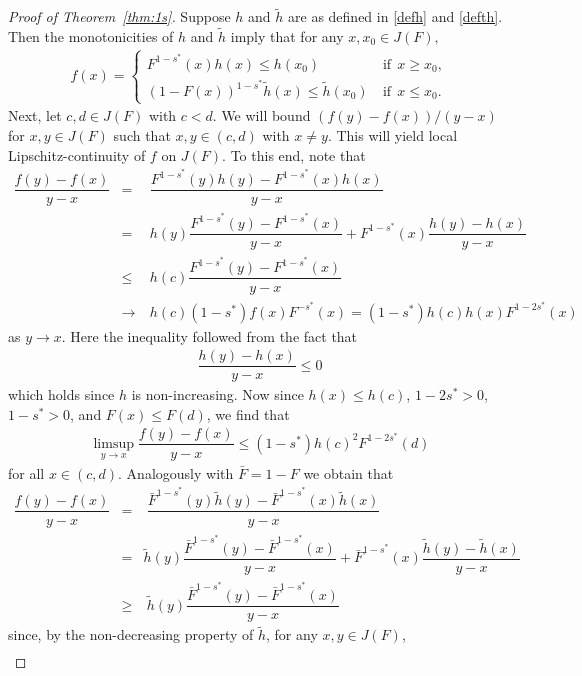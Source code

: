 \documentclass[11pt]{amsart}
\numberwithin{equation}{section}
\theoremstyle{definition}\newtheorem{definition}{Definition}
\theoremstyle{remark}\newtheorem{assumption}{Assumption}
\theoremstyle{remark}\newtheorem{remark}{Remark}
\theoremstyle{definition}\newtheorem{example}{Example}
\theoremstyle{plain}\newtheorem{question}{Question}
\theoremstyle{plain}\newtheorem{theorem}{Theorem}
\theoremstyle{plain}\newtheorem{lemma}{Lemma}
\theoremstyle{plain}\newtheorem{proposition}{Proposition}
\theoremstyle{plain}\newtheorem{corollary}{Corollary}
\theoremstyle{plain}\newtheorem{conjecture}{Conjecture}
\begin{document}
\begin{proof}[Proof of Theorem~\ref{thm:1s}]
Suppose $h$ and $\tilde{h}$ are as defined in \eqref{defh} and \eqref{defth}. 
    Then the monotonicities of $h$ and $\tilde{h}$ imply that for any $x,x_0\in J(F),$
\begin{eqnarray*}
      f(x)=\begin{cases}
      F^{1-s^*}(x)h(x)\leq h(x_0) &  \ \mbox{if} \ \  x\geq x_0,\\
      (1-F(x))^{1-s^*}\tilde{h}(x)\leq \tilde{h}(x_0) & \ \mbox{if} \ \  x\leq x_0.
      \end{cases}
 \end{eqnarray*}
 Next, let $c,d \in J(F)$ with $c<d$. 
 We will  bound $(f(y)-f(x))/(y-x)$ for $x,y\in J(F)$ such that $x,y\in(c,d)$ with $x \neq y$.
  This will yield local Lipschitz-continuity of $f$ on $J(F)$. 
  To this end, note that
\begin{eqnarray*}
 \dfrac{f(y)-f(x)}{y-x}
 & = & \ \dfrac{F^{1-s^*}(y)h(y)-F^{1-s^*}(x)h(x)}{y-x}\\
 & = & \  h(y)\dfrac{F^{1-s^*}(y)-F^{1-s^*}(x)}{y-x}+F^{1-s^*}(x)\dfrac{h(y)-h(x)}{y-x}\\
 & \leq & \  h(c)\dfrac{F^{1-s^*}(y)-F^{1-s^*}(x)}{y-x}\\
 & \to &  \  h(c) (1-s^*)f(x) F^{-s^*}(x)=(1-s^{*})h(c)h(x)F^{1-2s^{*}}(x)
\end{eqnarray*} 
as $y\to x$.  Here the inequality followed from the fact that 
\begin{eqnarray*}
\dfrac{h(y)-h(x)}{y-x}\leq 0
\end{eqnarray*} 
which holds since $h$ is non-increasing.
Now  since $h(x)\leq h(c)$, $1-2 s^{*}>0$, $1-s^{*} >0$, and $F(x)\leq F(d)$, we find that
\begin{eqnarray*}
\limsup_{y\to x}\dfrac{f(y)-f(x)}{y-x}\leq (1-s^*)h(c)^2F^{1-2s^*}(d)
\label{4eq1}
\end{eqnarray*}
 for all $x\in(c,d)$.
Analogously with $\bar{F}=1-F$ we obtain that
\begin{eqnarray*}
\dfrac{f(y)-f(x)}{y-x}
& = & \ \dfrac{\bar{F}^{1-s^*}(y)\tilde{h}(y)-\bar{F}^{1-s^*}(x)\tilde{h}(x)}{y-x}\\
& = & \tilde{h}(y)\dfrac{\bar{F}^{1-s^*}(y)-\bar{F}^{1-s^*}(x)}{y-x}+\bar{F}^{1-s^*}(x)\dfrac{\tilde{h}(y)-\tilde{h}(x)}{y-x}\\
& \geq & \  \tilde{h}(y)\dfrac{\bar{F}^{1-s^*}(y)-\bar{F}^{1-s^*}(x)}{y-x}
\end{eqnarray*} 
since, by the non-decreasing property of $\tilde{h}$, for any $x,y\in J(F)$, 
\begin{eqnarray*}

\end{eqnarray*}
\end{proof}
\end{document}
